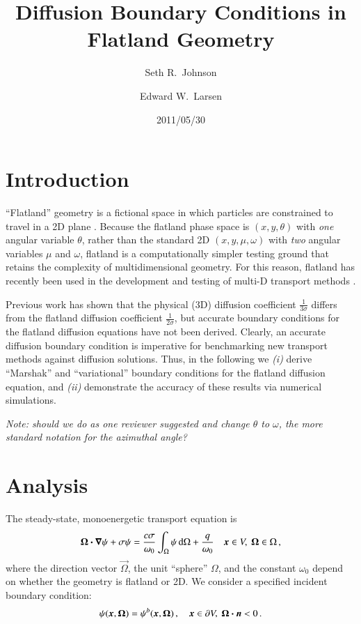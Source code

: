 \documentclass{anstrans}
\title{Diffusion Boundary Conditions in Flatland Geometry}
\author{Seth R.~Johnson \and Edward W.~Larsen}
\institute{Department of Nuclear Engineering \& Radiological Sciences, University of Michigan, Ann Arbor, MI, 48109}
\date{2011/05/30}
\begin{document}
\section{Introduction}
``Flatland'' geometry is a fictional space in which particles are constrained to
travel in a 2D plane \cite{Asa2008}. Because the flatland phase space is
$(x,y,\theta)$ with \emph{one} angular variable $\theta$, rather than the
standard 2D $(x,y,\mu,\omega)$ with \emph{two} angular variables $\mu$ and
$\omega$, flatland is a computationally simpler testing ground that retains the
complexity of multidimensional geometry. For this reason, flatland has recently
been used in the development and testing of multi-D transport methods
\cite{Lar2009c,Joh2011,Tra2011}.

Previous work has shown that the physical (3D) diffusion coefficient
$\frac{1}{3\sigma}$ differs from the flatland diffusion coefficient
$\frac{1}{2\sigma}$, but accurate boundary conditions for the flatland
diffusion equations have not been derived. Clearly, an accurate diffusion
boundary condition is imperative for benchmarking new transport methods against
diffusion solutions. Thus, in the following we \textsl{(i)} derive ``Marshak''
and ``variational'' boundary conditions for the flatland diffusion equation,
and \textsl{(ii)} demonstrate the accuracy of these results via numerical
simulations.

\emph{Note: should we do as one reviewer suggested and change $\theta$ to
$\omega$, the more standard notation for the azimuthal angle?}

\section{Analysis}
The steady-state, monoenergetic transport equation is
\begin{equation}\label{eq:generalTransport}
  \bm{\Omega}\bm{\cdot} \bm{\nabla} \psi + \sigma \psi
  = \frac{c \sigma}{\omega_0} \int_{\Omega} \psi \mathop{}\!\mathrm{d}\Omega + \frac{q}{\omega_0}
  \quad \bm{x}\in V,\ \bm{\Omega}\in \Omega \,,
\end{equation}
where the direction vector $\vec{\Omega}$, the unit ``sphere'' $\Omega$, and
the constant $\omega_0$ depend on whether the geometry
is flatland or 2D. We consider a specified incident boundary condition:
\begin{equation} \label{eq:ssBndy}
  \psi(\bm{x}, \bm{\Omega}) = \psi^b(\bm{x}, \bm{\Omega})\,,
  \quad \bm{x}\in \partial V,\ \bm{\Omega} \bm{\cdot} \bm{n} < 0\,.
\end{equation}
\end{document}
